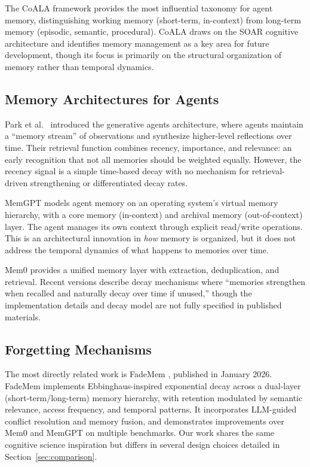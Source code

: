 \documentclass[11pt,a4paper]{article}
\begin{document}
The CoALA framework \citep{sumers2024coala} provides the most influential taxonomy for agent memory, distinguishing working memory (short-term, in-context) from long-term memory (episodic, semantic, procedural). CoALA draws on the SOAR cognitive architecture and identifies memory management as a key area for future development, though its focus is primarily on the structural organization of memory rather than temporal dynamics.

\subsection{Memory Architectures for Agents}

Park et al.~\citeyearpar{park2023generative} introduced the generative agents architecture, where agents maintain a ``memory stream'' of observations and synthesize higher-level reflections over time. Their retrieval function combines recency, importance, and relevance: an early recognition that not all memories should be weighted equally. However, the recency signal is a simple time-based decay with no mechanism for retrieval-driven strengthening or differentiated decay rates.

MemGPT \citep{packer2023memgpt} models agent memory on an operating system's virtual memory hierarchy, with a core memory (in-context) and archival memory (out-of-context) layer. The agent manages its own context through explicit read/write operations. This is an architectural innovation in \emph{how} memory is organized, but it does not address the temporal dynamics of what happens to memories over time.

Mem0 \citep{chhikara2024mem0} provides a unified memory layer with extraction, deduplication, and retrieval. Recent versions describe decay mechanisms where ``memories strengthen when recalled and naturally decay over time if unused,'' though the implementation details and decay model are not fully specified in published materials.

\subsection{Forgetting Mechanisms}

The most directly related work is FadeMem \citep{wei2026fademem}, published in January 2026. FadeMem implements Ebbinghaus-inspired exponential decay across a dual-layer (short-term/long-term) memory hierarchy, with retention modulated by semantic relevance, access frequency, and temporal patterns. It incorporates LLM-guided conflict resolution and memory fusion, and demonstrates improvements over Mem0 and MemGPT on multiple benchmarks. Our work shares the same cognitive science inspiration but differs in several design choices detailed in Section~\ref{sec:comparison}.
\end{document}
